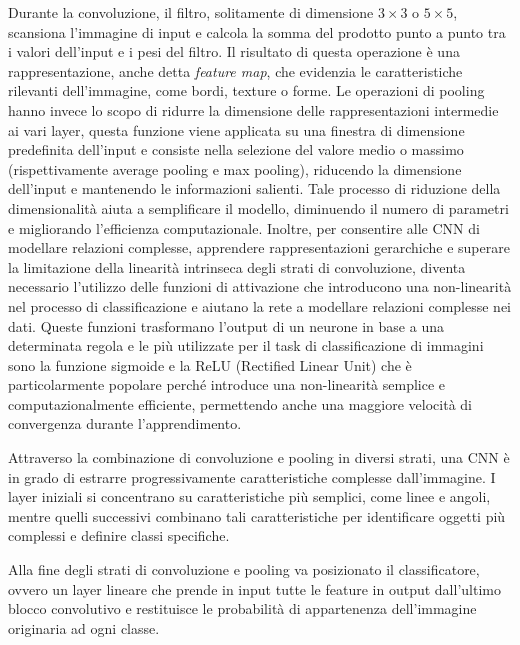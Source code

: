 Durante la convoluzione, il filtro, solitamente di dimensione $3\times3$ o $5\times5$, scansiona l'immagine di input e calcola la somma del prodotto punto a punto tra i valori dell'input e i pesi del filtro. Il risultato di questa operazione è una rappresentazione, anche detta \textit{feature map}, che evidenzia le caratteristiche rilevanti dell'immagine, come bordi, texture o forme. Le operazioni di pooling hanno invece lo scopo di ridurre la dimensione delle rappresentazioni intermedie ai vari layer, questa funzione viene applicata su una finestra di dimensione predefinita dell'input e consiste nella selezione del valore medio o massimo (rispettivamente average pooling e  max pooling), riducendo la dimensione dell'input e mantenendo le informazioni salienti. Tale processo di riduzione della dimensionalità aiuta a semplificare il modello, diminuendo il numero di parametri e migliorando l'efficienza computazionale. Inoltre, per consentire alle CNN di modellare relazioni complesse, apprendere rappresentazioni gerarchiche e superare la limitazione della linearità intrinseca degli strati di convoluzione, diventa necessario l'utilizzo delle funzioni di attivazione che introducono una non-linearità nel processo di classificazione e aiutano la rete a modellare relazioni complesse nei dati. Queste funzioni trasformano l'output di un neurone in base a una determinata regola e le più utilizzate per il task di classificazione di immagini sono la funzione sigmoide e la ReLU (Rectified Linear Unit) che è particolarmente popolare perché introduce una non-linearità semplice e computazionalmente efficiente, permettendo anche una maggiore velocità di convergenza durante l'apprendimento.

\iffalse
\begin{figure}[ht!]
    \centering
    \psfig{file=immagini/cnn.png,width=0.9\textwidth}
    \caption{\textit{Convolutional Neural Network per la classificazione di immagini}.}
    \label{fig:cnn}
\end{figure}
\fi

Attraverso la combinazione di convoluzione e pooling in diversi strati, una CNN è in grado di estrarre progressivamente caratteristiche complesse dall'immagine. I layer iniziali si concentrano su caratteristiche più semplici, come linee e angoli, mentre quelli successivi combinano tali caratteristiche per identificare oggetti più complessi e definire classi specifiche. 
\cite{10.1093}

Alla fine degli strati di convoluzione e pooling va posizionato il classificatore, ovvero un layer lineare che prende in input tutte le feature in output dall'ultimo blocco convolutivo e restituisce le probabilità di appartenenza dell'immagine originaria ad ogni classe. \\


